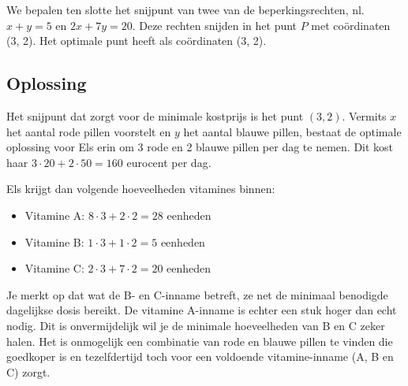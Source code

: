 We bepalen ten slotte
het snijpunt van twee van de beperkingsrechten, nl. $x + y
= 5$ en $2x + 7y = 20$. Deze rechten snijden in het punt $P$
met co\"{o}rdinaten (3, 2). Het optimale punt heeft als co\"{o}rdinaten (3, 2).


\subsection{Oplossing}
Het snijpunt dat zorgt voor de minimale kostprijs is het punt
$(3, 2)$. Vermits $x$ het aantal rode pillen voorstelt en $y$ het aantal
blauwe pillen, bestaat de optimale oplossing voor
Els erin om 3 rode en 2 blauwe pillen per dag te nemen. Dit kost
haar $3\cdot 20 + 2\cdot 50 = 160$ eurocent per dag.

Els krijgt dan volgende hoeveelheden vitamines binnen:
\begin{itemize}
    \item  Vitamine A: $8\cdot 3 + 2\cdot 2 = 28$ eenheden

    \item  Vitamine B: $1\cdot 3 + 1\cdot 2 = 5$ eenheden

    \item  Vitamine C: $2\cdot 3 + 7\cdot 2 = 20$ eenheden
\end{itemize}
Je merkt op dat wat de B- en C-inname betreft, ze net de minimaal
benodigde dagelijkse dosis bereikt. De vitamine A-inname is echter
een stuk hoger dan echt nodig. Dit is onvermijdelijk wil je de
minimale hoeveelheden van B en C zeker halen.
Het is onmogelijk een combinatie van rode en blauwe pillen te
vinden die goedkoper is en tezelfdertijd toch voor een voldoende
vitamine-inname (A, B en C) zorgt.


